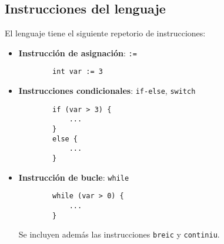 \documentclass[10pt,a4paper]{article}
\begin{document}
\subsection{Instrucciones del lenguaje}
El lenguaje tiene el siguiente repetorio de instrucciones:
\begin{itemize}
    \item \textbf{Instrucción de asignación}: \texttt{:=}
    \begin{lstlisting}
        int var := 3
    \end{lstlisting}
    \item \textbf{Instrucciones condicionales}: \texttt{if-else}, \texttt{switch}
    \begin{lstlisting}
        if (var > 3) {
            ...
        }
        else {
            ...
        }
    \end{lstlisting}
    \item \textbf{Instrucción de bucle}: \texttt{while}
    \begin{lstlisting}
        while (var > 0) {
            ...
        }
    \end{lstlisting}
    Se incluyen además las instrucciones \texttt{breic} y \texttt{continiu}.
\end{itemize}
\end{document}
